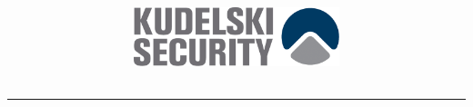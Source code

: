\documentclass[english,12pt,svgnames]{report}
\newcommand{\HRule}[1]{\rule{\linewidth}{#1}}
\begin{document}
\title{ 
\includegraphics[width=6cm]{img/ks_logo.png}
        \\ [1.5cm]
        \HRule{0.5pt} \\
	\vspace*{0.5\baselineskip}
        {
                \Large
                \ReportTitle \\
        }
}

\date{}
\author{}


{\tableofcontents}

{



\newpage


\newpage


\newpage


}
\end{document}
